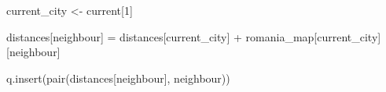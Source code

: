 \documentclass[12pt]{article}
\begin{document}
\begin{justify}
{\fontsize{8pt}{9.6pt}\selectfont  \tabto{0.75in} \tab \tab current\_city <- current[1]\par}
\end{justify}\par

\begin{justify}
 \tabto{0.75in} \tab {}
\end{justify}\par

\begin{adjustwidth}{0.5in}{0.0in}
\begin{justify}
 \tabto{0.75in} \tab \tab {}
\end{justify}\par

\end{adjustwidth}

\begin{adjustwidth}{0.5in}{0.0in}
\begin{justify}
{\fontsize{8pt}{9.6pt}\selectfont  \tabto{0.75in} \tab \tab \tab \tab distances[neighbour] = distances[current\_city] + \tab \tab \tab \tab \tab \tab \tab \tab \tab romania\_map[current\_city][neighbour]\par}
\end{justify}\par

\end{adjustwidth}

\begin{adjustwidth}{0.5in}{0.0in}
\begin{justify}
{\fontsize{8pt}{9.6pt}\selectfont  \tabto{0.75in} \tab \tab \tab \tab q.insert(pair(distances[neighbour], neighbour))\par}
\end{justify}\par

\end{adjustwidth}

\tab \tab 
\vspace{\baselineskip}\tab \tab \tab \tab 
\vspace{\baselineskip}\begin{adjustwidth}{0.5in}{0.0in}
\begin{justify}
 \tabto{0.75in} 
\end{justify}\par

\end{adjustwidth}
\end{document}
